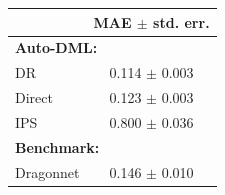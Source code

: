 \begin{tabular}{lc} 
\toprule 
& MAE $\pm$ std. err. \\ 
\midrule 
\multicolumn{2}{l}{\textbf{Auto-DML:}} \\ 
DR & 0.114 $\pm$ 0.003 \\ 
Direct & 0.123 $\pm$ 0.003 \\ 
IPS & 0.800 $\pm$ 0.036 \\ 
\multicolumn{2}{l}{\textbf{Benchmark:}} \\ 
Dragonnet & 0.146 $\pm$ 0.010 \\ 
\bottomrule 
 \end{tabular}